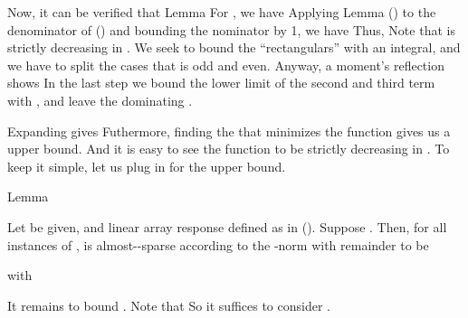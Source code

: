 Now, it can be verified that
\Result
{Lemma}
{
For , we have
}
Applying Lemma () to the denominator of () and bounding the nominator by 1, we have
Thus,
Note that  is strictly decreasing in .
We seek to bound the ``rectangulars'' with an integral, and we have to split the cases that  is odd and even.
Anyway, a moment's reflection shows
In the last step we bound the lower limit of the second and third term with , and leave the dominating .

Expanding  gives
Futhermore, finding the  that minimizes the function gives us a upper bound.
And it is easy to see the function to be strictly decreasing in .
To keep it simple, let us plug in  for the upper bound.

\Result
{Lemma}
{
Let  be given, and linear array response  defined as in ().
Suppose .
Then, for all instances of \m {\f},  is almost--sparse according to the -norm with remainder  to be

with
}

It remains to bound .
Note that
So it suffices to consider .


